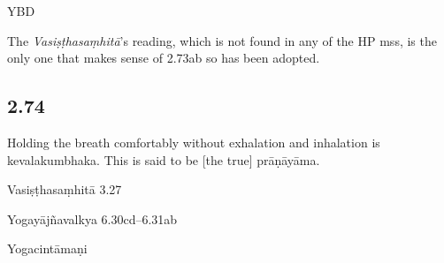 \begin{ekdosis}
\begin{testimonia}[hp02_073]
YBD

\begin{versinnote}
\end{versinnote}
\end{testimonia}

\begin{philcomm}[hp02_073]
The \emph{Vasiṣṭhasaṃhitā}’s reading, which is not found in any of the HP mss, is the only one that makes sense of 2.73ab so has been adopted.
\end{philcomm}

\subsection*{2.74}
\begin{translation}[hp02_074]
Holding the breath comfortably without exhalation and inhalation is kevalakumbhaka. This is said to be [the true] prāṇāyāma. 
\end{translation}

\begin{sources}[hp02_074]
Vasiṣṭhasaṃhitā 3.27

\begin{versinnote}
\end{versinnote}

Yogayājñavalkya 6.30cd–6.31ab

\begin{versinnote}
\end{versinnote}
\end{sources}

\begin{testimonia}[hp02_074]
Yogacintāmaṇi

\begin{versinnote}
\end{versinnote}


\end{testimonia}
\end{ekdosis}
